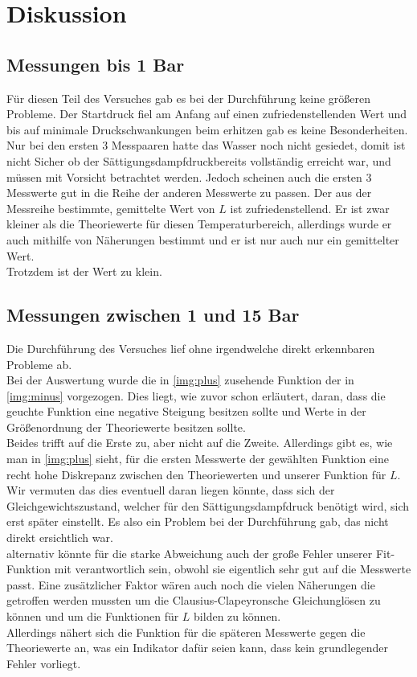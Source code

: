 \section{Diskussion}
\subsection{Messungen bis 1 Bar}

Für diesen Teil des Versuches gab es bei der Durchführung keine größeren Probleme. Der Startdruck fiel am Anfang auf einen 
zufriedenstellenden Wert und bis auf minimale Druckschwankungen beim erhitzen gab es keine Besonderheiten. Nur bei den ersten
3 Messpaaren hatte das Wasser noch nicht gesiedet, domit ist nicht Sicher ob der Sättigungsdampfdruckbereits vollständig erreicht war,
und müssen mit Vorsicht betrachtet werden. Jedoch scheinen auch die ersten 3 Messwerte gut in die Reihe der anderen Messwerte zu passen.
Der aus der Messreihe bestimmte, gemittelte Wert von $L$ ist zufriedenstellend. Er ist zwar kleiner als die Theoriewerte für diesen Temperaturbereich,
allerdings wurde er auch mithilfe von Näherungen bestimmt und er ist nur auch nur ein gemittelter Wert. \\
Trotzdem ist der Wert zu klein.


\subsection{Messungen zwischen 1 und 15 Bar}

Die Durchführung des Versuches lief ohne irgendwelche direkt erkennbaren Probleme ab.\\
Bei der Auswertung wurde die in \ref{img:plus} zusehende Funktion der in \ref{img:minus} vorgezogen.
Dies liegt, wie zuvor schon erläutert, daran, dass die geuchte Funktion eine negative Steigung besitzen sollte und Werte in der Größenordnung der Theoriewerte besitzen sollte.\\
Beides trifft auf die Erste zu, aber nicht auf die Zweite.
Allerdings gibt es, wie man in \ref{img:plus} sieht, für die ersten Messwerte der gewählten Funktion eine recht hohe Diskrepanz zwischen den Theoriewerten und unserer Funktion für $L$.
Wir vermuten das dies eventuell daran liegen könnte, dass sich der Gleichgewichtszustand, welcher für den Sättigungsdampfdruck benötigt wird, sich erst später einstellt.
Es also ein Problem bei der Durchführung gab, das nicht direkt ersichtlich war.\\
alternativ könnte für die starke Abweichung auch der große Fehler unserer Fit-Funktion mit verantwortlich sein, obwohl sie eigentlich sehr gut auf 
die Messwerte passt. Eine zusätzlicher Faktor wären auch noch die vielen Näherungen die getroffen werden mussten um die Clausius-Clapeyronsche Gleichunglösen zu können
und um die Funktionen für $L$ bilden zu können.\\
Allerdings nähert sich die Funktion für die späteren Messwerte gegen die Theoriewerte an, was ein Indikator dafür seien kann, dass kein grundlegender Fehler vorliegt.\\

